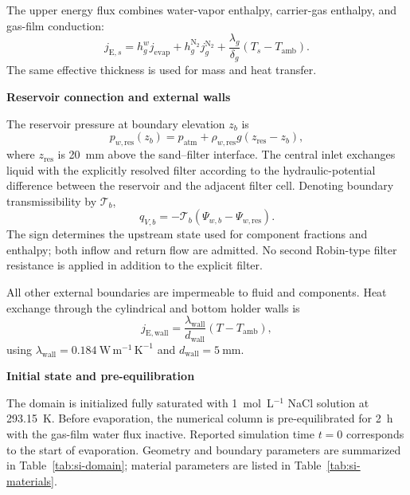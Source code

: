 \documentclass[draft,wrr]{agutexSI2019}
\newcommand{\sisub}[1]{\par\medskip\noindent\textbf{#1}\par\nobreak\smallskip}
\begin{document}
\begin{article}
The upper energy flux combines water-vapor enthalpy, carrier-gas enthalpy, and
gas-film conduction:
\begin{equation}
j_{\mathrm{E},s}=
h_g^w j_{\mathrm{evap}}
+h_g^{\mathrm{N_2}}j_g^{\mathrm{N_2}}
+\frac{\lambda_g}{\delta_g}(T_s-T_{\mathrm{amb}}).
\label{eq:si-top-energy}
\end{equation}
The same effective thickness is used for mass and heat transfer.

\sisub{Reservoir connection and external walls}

The reservoir pressure at boundary elevation $z_b$ is
\begin{equation}
p_{w,\mathrm{res}}(z_b)=p_{\mathrm{atm}}
+\rho_{w,\mathrm{res}}g(z_{\mathrm{res}}-z_b),
\label{eq:si-reservoir-pressure}
\end{equation}
where $z_{\mathrm{res}}$ is 20~mm above the sand--filter interface. The central
inlet exchanges liquid with the explicitly resolved filter according to the
hydraulic-potential difference between the reservoir and the adjacent filter
cell. Denoting boundary transmissibility by $\mathcal{T}_b$,
\begin{equation}
q_{V,b}=-\mathcal{T}_b
\left(\Psi_{w,b}-\Psi_{w,\mathrm{res}}\right).
\label{eq:si-bottom-flux}
\end{equation}
The sign determines the upstream state used for component fractions and
enthalpy; both inflow and return flow are admitted. No second Robin-type filter
resistance is applied in addition to the explicit filter.

All other external boundaries are impermeable to fluid and components. Heat
exchange through the cylindrical and bottom holder walls is
\begin{equation}
j_{\mathrm{E},\mathrm{wall}}=
\frac{\lambda_{\mathrm{wall}}}{d_{\mathrm{wall}}}
(T-T_{\mathrm{amb}}),
\label{eq:si-wall-heat}
\end{equation}
using $\lambda_{\mathrm{wall}}=0.184~\mathrm{W\,m^{-1}\,K^{-1}}$ and
$d_{\mathrm{wall}}=5~\mathrm{mm}$.

\sisub{Initial state and pre-equilibration}

The domain is initialized fully saturated with 1~mol~L$^{-1}$ NaCl solution at
293.15~K. Before evaporation, the numerical column is pre-equilibrated for 2~h
with the gas-film water flux inactive. Reported simulation time $t=0$
corresponds to the start of evaporation. Geometry and boundary parameters are
summarized in Table~\ref{tab:si-domain}; material parameters are listed in
Table~\ref{tab:si-materials}.


\end{article}
\end{document}
